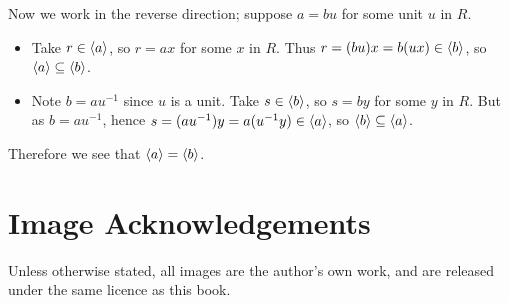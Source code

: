 \begin{enumerate}
    Now we work in the reverse direction; suppose $a = bu$ for some unit $u$ in $R$.
    \begin{itemize}
        \item Take $r \in \left\langle a\right\rangle$, so $r = ax$ for some $x$ in $R$. Thus $r = (bu)x = b(ux) \in \left\langle b\right\rangle$, so $\left\langle a\right\rangle \subseteq \left\langle b\right\rangle$.
        \item Note $b = au^{-1}$ since $u$ is a unit. Take $s \in \left\langle b\right\rangle$, so $s = by$ for some $y$ in $R$. But as $b = au^{-1}$, hence $s = (au^{-1})y = a(u^{-1}y) \in \left\langle a\right\rangle$, so $\left\langle b\right\rangle \subseteq \left\langle a\right\rangle$.
    \end{itemize}
    Therefore we see that $\left\langle a\right\rangle = \left\langle b\right\rangle$.
\end{enumerate}

\chapter{Image Acknowledgements}
Unless otherwise stated, all images are the author's own work, and are released under the same licence as this book.

\printbibliography[heading=bibintoc, title={References and Bibliography}]
\printindex


